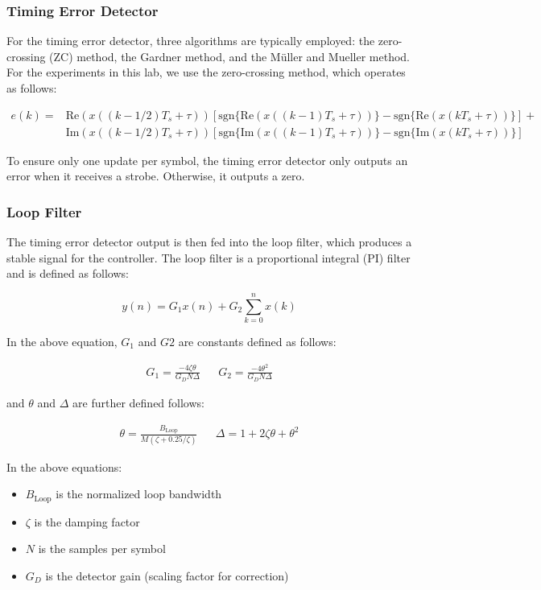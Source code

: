 \documentclass{article}
\begin{document}
\subsubsection{Timing Error Detector}
For the timing error detector, three algorithms are typically employed: the zero-crossing (ZC) method, the Gardner method, and the M\"{u}ller and Mueller method. For the experiments in this lab, we use the zero-crossing method, which operates as follows:

\begin{align}
	e(k) = &\text{Re}(x((k-1/2)T_s + \tau))\left[\text{sgn}\{\text{Re}(x((k-1)T_s+\tau))\} - \text{sgn}\{\text{Re}(x(kT_s+\tau))\}\right] + \\
	&\text{Im}(x((k-1/2)T_s + \tau))\left[\text{sgn}\{\text{Im}(x((k-1)T_s+\tau))\} - \text{sgn}\{\text{Im}(x(kT_s+\tau))\}\right]
\end{align}

\noindent To ensure only one update per symbol, the timing error detector only outputs an error when it receives a strobe. Otherwise, it outputs a zero.

\subsubsection{Loop Filter}
The timing error detector output is then fed into the loop filter, which produces a stable signal for the controller. The loop filter is a proportional integral (PI) filter and is defined as follows:

\begin{equation}
	y(n) = G_1x(n) + G_2\sum_{k=0}^{n}{x(k)}
\end{equation}

\noindent In the above equation, $G_1$ and $G2$ are constants defined as follows:

\begin{align}
	G_1 = \frac{-4\zeta\theta}{G_DN\Delta} && G_2 = \frac{-4\theta^2}{G_DN\Delta}
\end{align}

\noindent and $\theta$ and $\Delta$ are further defined follows:

\begin{align}
	\theta = \frac{B_{\text{Loop}}}{M(\zeta + 0.25/\zeta)} && \Delta = 1 + 2\zeta\theta + \theta^2
\end{align}

\noindent In the above equations:

\begin{itemize}
	\item $B_{\text{Loop}}$ is the normalized loop bandwidth
	\item $\zeta$ is the damping factor
	\item $N$ is the samples per symbol
	\item $G_D$ is the detector gain (scaling factor for correction)
\end{itemize}
\end{document}
